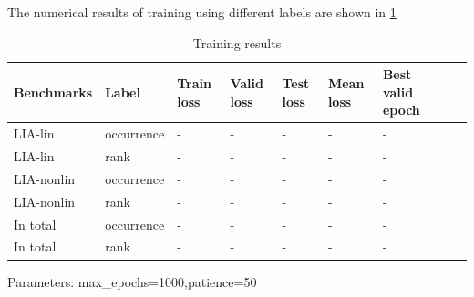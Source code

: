 \documentclass{article}
\begin{document}
The numerical results of training using different labels are shown in \ref{training-results}
\begin{table}[h]\caption{Training results}\label{training-results}
\begin{center}
\begin{tabular}{lp{1.5cm}p{1.5cm}p{1.5cm}p{1.5cm}p{1.5cm}p{1.5cm}p{1.5cm}p{1.5cm}}
\hline
Benchmarks  & Label & Train loss & Valid loss & Test loss & Mean loss & Best valid epoch  \\
\hline
LIA-lin       & occurrence & - & - & - & - & - \\
LIA-lin       & rank & - & - & - & - & - \\
LIA-nonlin    & occurrence & - & - & - & - & - \\
LIA-nonlin    & rank & - & - & - & - & - \\
In total      & occurrence & - & - & - & - & - \\
In total      & rank & - & - & - & - & - \\
\hline
\end{tabular}
\end{center}
\end{table}

Parameters: max\_epochs=1000,patience=50
%
\end{document}
